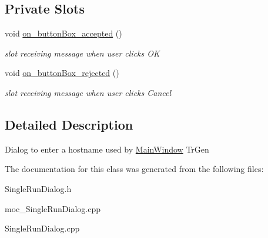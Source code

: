 \subsection*{Private Slots}
\begin{CompactItemize}
\item 
\hypertarget{classSingleRunDialog_8a7ca35a48e03609bea17efb6b716642}{
void \hyperlink{classSingleRunDialog_8a7ca35a48e03609bea17efb6b716642}{on\_\-buttonBox\_\-accepted} ()}
\label{classSingleRunDialog_8a7ca35a48e03609bea17efb6b716642}

\begin{CompactList}\small\item\em slot receiving message when user clicks OK \item\end{CompactList}\item 
\hypertarget{classSingleRunDialog_f8ff889a5365f4079127749ebfa89137}{
void \hyperlink{classSingleRunDialog_f8ff889a5365f4079127749ebfa89137}{on\_\-buttonBox\_\-rejected} ()}
\label{classSingleRunDialog_f8ff889a5365f4079127749ebfa89137}

\begin{CompactList}\small\item\em slot receiving message when user clicks Cancel \item\end{CompactList}\end{CompactItemize}


\subsection{Detailed Description}
Dialog to enter a hostname used by \hyperlink{classMainWindow}{MainWindow} TrGen 

The documentation for this class was generated from the following files:\begin{CompactItemize}
\item 
SingleRunDialog.h\item 
moc\_\-SingleRunDialog.cpp\item 
SingleRunDialog.cpp\end{CompactItemize}
